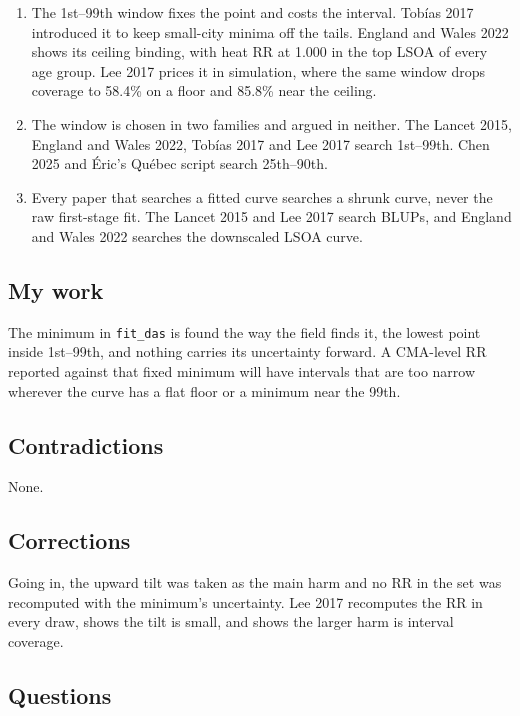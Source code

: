 \documentclass[11pt]{article}
\begin{document}
\begin{enumerate}[leftmargin=*]
\item The 1st--99th window fixes the point and costs the interval.
Tob\'ias 2017 introduced it to keep small-city minima off the tails.
England and Wales 2022 shows its ceiling binding, with heat RR at 1.000 in the top LSOA of every age group.
Lee 2017 prices it in simulation, where the same window drops coverage to 58.4\% on a floor and 85.8\% near the ceiling.
\item The window is chosen in two families and argued in neither.
The Lancet 2015, England and Wales 2022, Tob\'ias 2017 and Lee 2017 search 1st--99th.
Chen 2025 and \'Eric's Qu\'ebec script search 25th--90th.
\item Every paper that searches a fitted curve searches a shrunk curve, never the raw first-stage fit.
The Lancet 2015 and Lee 2017 search BLUPs, and England and Wales 2022 searches the downscaled LSOA curve.
\end{enumerate}

\subsection*{My work}

The minimum in \texttt{fit\_das} is found the way the field finds it, the lowest point inside 1st--99th, and nothing carries its uncertainty forward.
A CMA-level RR reported against that fixed minimum will have intervals that are too narrow wherever the curve has a flat floor or a minimum near the 99th.

\subsection*{Contradictions}

None.

\subsection*{Corrections}

Going in, the upward tilt was taken as the main harm and no RR in the set was recomputed with the minimum's uncertainty.
Lee 2017 recomputes the RR in every draw, shows the tilt is small, and shows the larger harm is interval coverage.

\subsection*{Questions}
\end{document}
